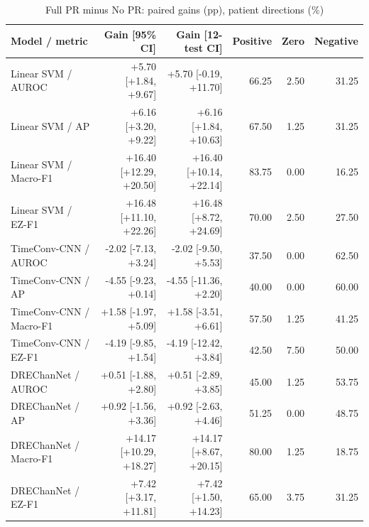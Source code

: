 \begin{table}[t]
\centering
\caption{Full PR minus No PR: paired gains (pp), patient directions (\%)}
\small
\begin{tabular}{lrrrrr}
\toprule
Model / metric & Gain [95\% CI] & Gain [12-test CI] & Positive & Zero & Negative \\
\midrule
Linear SVM / AUROC & +5.70 [+1.84, +9.67] & +5.70 [-0.19, +11.70] & 66.25 & 2.50 & 31.25 \\
Linear SVM / AP & +6.16 [+3.20, +9.22] & +6.16 [+1.84, +10.63] & 67.50 & 1.25 & 31.25 \\
Linear SVM / Macro-F1 & +16.40 [+12.29, +20.50] & +16.40 [+10.14, +22.14] & 83.75 & 0.00 & 16.25 \\
Linear SVM / EZ-F1 & +16.48 [+11.10, +22.26] & +16.48 [+8.72, +24.69] & 70.00 & 2.50 & 27.50 \\
TimeConv-CNN / AUROC & -2.02 [-7.13, +3.24] & -2.02 [-9.50, +5.53] & 37.50 & 0.00 & 62.50 \\
TimeConv-CNN / AP & -4.55 [-9.23, +0.14] & -4.55 [-11.36, +2.20] & 40.00 & 0.00 & 60.00 \\
TimeConv-CNN / Macro-F1 & +1.58 [-1.97, +5.09] & +1.58 [-3.51, +6.61] & 57.50 & 1.25 & 41.25 \\
TimeConv-CNN / EZ-F1 & -4.19 [-9.85, +1.54] & -4.19 [-12.42, +3.84] & 42.50 & 7.50 & 50.00 \\
DREChanNet / AUROC & +0.51 [-1.88, +2.80] & +0.51 [-2.89, +3.85] & 45.00 & 1.25 & 53.75 \\
DREChanNet / AP & +0.92 [-1.56, +3.36] & +0.92 [-2.63, +4.46] & 51.25 & 0.00 & 48.75 \\
DREChanNet / Macro-F1 & +14.17 [+10.29, +18.27] & +14.17 [+8.67, +20.15] & 80.00 & 1.25 & 18.75 \\
DREChanNet / EZ-F1 & +7.42 [+3.17, +11.81] & +7.42 [+1.50, +14.23] & 65.00 & 3.75 & 31.25 \\
\bottomrule
\end{tabular}
\end{table}
